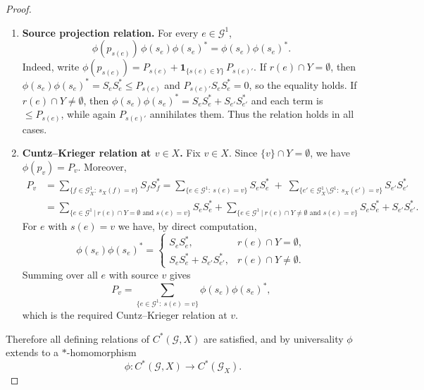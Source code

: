 \documentclass[12pt, reqno]{amsart}
\theoremstyle{definition}
\theoremstyle{remark}
\numberwithin{equation}{section}
\newcommand{\G}{\mathcal{G}}
\begin{document}
\begin{proof}
\begin{enumerate}
\item \textbf{Source projection relation.}
For every $e\in\mathcal{G}^1$,
\[
\phi(p_{s(e)})\,\phi(s_e)\phi(s_e)^*=\phi(s_e)\phi(s_e)^*.
\]
Indeed, write $\phi(p_{s(e)})=P_{s(e)}+\mathbf{1}_{\{s(e)\in Y\}}\,P_{s(e)'}$.  
If $r(e)\cap Y=\emptyset$, then $\phi(s_e)\phi(s_e)^*=S_eS_e^*\le P_{s(e)}$ and $P_{s(e)'}S_eS_e^*=0$, so the equality holds.  
If $r(e)\cap Y\neq\emptyset$, then $\phi(s_e)\phi(s_e)^*=S_eS_e^*+S_{e'}S_{e'}^*$ and each term is $\le P_{s(e)}$, while again $P_{s(e)'}$ annihilates them. Thus the relation holds in all cases.

\item \textbf{Cuntz--Krieger relation at $v\in X$.}
Fix $v\in X$. Since $\{v\}\cap Y=\emptyset$, we have $\phi(p_v)=P_v$. Moreover,
\begin{align*}
P_v
&=\sum_{\{f\in\mathcal{G}_X^1:\ s_X(f)=v\}} S_fS_f^* = \sum_{\{e\in\mathcal{G}^1:\ s(e)=v\}} S_eS_e^*
\;+\;\sum_{\{e'\in\mathcal{G}_X^1\setminus\mathcal{G}^1:\ s_X(e')=v\}} S_{e'}S_{e'}^*\\
&= \sum\limits_{ \{ e \in \G^1 \ | \ r(e) \cap Y = \emptyset \textrm{ and } s(e) = v \} } S_e S_e^* + \sum\limits_{ \{ e \in \G^1 \ | \ r(e) \cap Y \neq \emptyset \textrm{ and } s(e) = v \} } S_e S_e^* + S_{e'}S_{e'}^*.
\end{align*}
For $e$ with $s(e)=v$ we have, by direct computation,
\[
\phi(s_e)\phi(s_e)^*=
\begin{cases}
S_eS_e^*, & r(e)\cap Y=\emptyset,\\[4pt]
S_eS_e^*+S_{e'}S_{e'}^*, & r(e)\cap Y\neq\emptyset.
\end{cases}
\]
Summing over all $e$ with source $v$ gives
\[
P_v=\sum_{\{e\in\mathcal{G}^1:\ s(e)=v\}} \phi(s_e)\phi(s_e)^*,
\]
which is the required Cuntz--Krieger relation at $v$.
\end{enumerate}

Therefore all defining relations of $C^*(\mathcal{G},X)$ are satisfied, and by universality $\phi$ extends to a $*$-homomorphism
\[
\phi: C^*(\mathcal{G},X)\longrightarrow C^*(\mathcal{G}_X).
\]
\end{proof}



\end{document}
